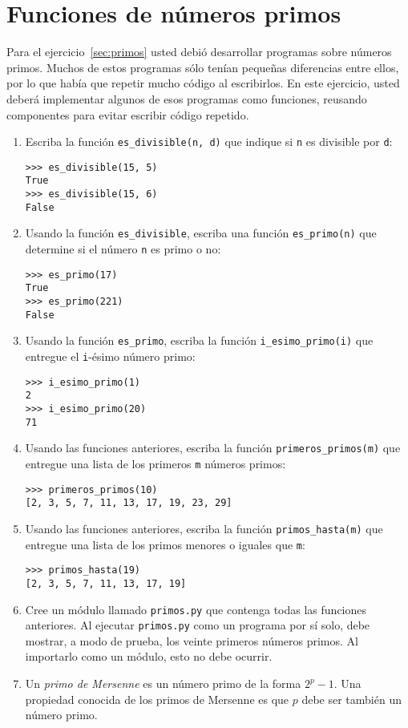 \section{Funciones de números primos}

Para el ejercicio~\ref{sec:primos} usted debió
desarrollar programas sobre números primos.
Muchos de estos programas sólo tenían pequeñas diferencias entre ellos,
por lo que había que repetir mucho código al escribirlos. En este
ejercicio, usted deberá implementar algunos de esos programas como
funciones, reusando componentes para evitar escribir código
repetido.

\begin{enumerate}
\item
  Escriba la función \lstinline!es_divisible(n, d)! que indique si
  \lstinline!n! es divisible por \lstinline!d!:

\begin{lstlisting}
>>> es_divisible(15, 5)
True
>>> es_divisible(15, 6)
False
\end{lstlisting}
\item
  Usando la función \lstinline!es_divisible!, escriba una función
  \lstinline!es_primo(n)! que determine si el número \lstinline!n!
  es primo o no:

\begin{lstlisting}
>>> es_primo(17)
True
>>> es_primo(221)
False
\end{lstlisting}
\item
  Usando la función \lstinline!es_primo!, escriba la función
  \lstinline!i_esimo_primo(i)! que entregue el \lstinline!i!-ésimo número primo:

\begin{lstlisting}
>>> i_esimo_primo(1)
2
>>> i_esimo_primo(20)
71
\end{lstlisting}
\item
  Usando las funciones anteriores, escriba la función
  \lstinline!primeros_primos(m)! que entregue una lista de los primeros
  \lstinline!m! números primos:

\begin{lstlisting}
>>> primeros_primos(10)
[2, 3, 5, 7, 11, 13, 17, 19, 23, 29]
\end{lstlisting}
\item
  Usando las funciones anteriores, escriba la función
  \lstinline!primos_hasta(m)! que entregue una lista de los primos
  menores o iguales que \lstinline!m!:

\begin{lstlisting}
>>> primos_hasta(19)
[2, 3, 5, 7, 11, 13, 17, 19]
\end{lstlisting}
\item
  Cree un módulo llamado \lstinline!primos.py! que contenga todas las
  funciones anteriores.
  Al ejecutar \lstinline!primos.py! como un programa por sí solo, debe
  mostrar, a modo de prueba, los veinte primeros números primos. Al
  importarlo como un módulo, esto no debe ocurrir.
\item
  Un \emph{primo de Mersenne} es un número primo de la forma \(2^p - 1\).
  Una propiedad conocida de los primos de Mersenne es que \(p\) debe ser
  también un número primo.


\end{enumerate}
